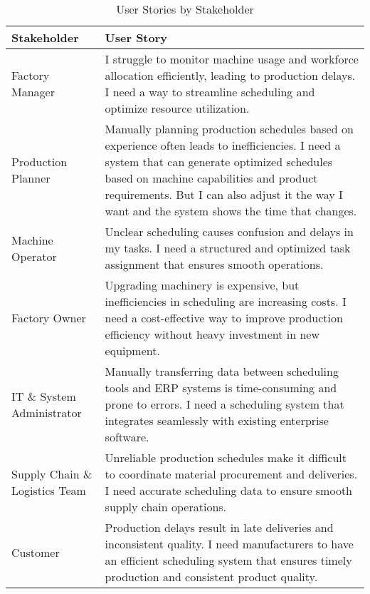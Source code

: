 \begin{table}[!h]
    \begin{adjustwidth}{-.85in}{-.85in}
        \noindent
        \centering
        \small\begin{tabularx}{1.3\textwidth}{|>{\columncolor{yellow!20}\raggedright\arraybackslash}p{2.5cm}|X|}
            \hline
            \textbf{Stakeholder} & \textbf{User Story} \\\hline
            Factory Manager & I struggle to monitor machine usage and workforce allocation efficiently, leading to production delays. I need a way to streamline scheduling and optimize resource utilization. \\\hline
            Production Planner & Manually planning production schedules based on experience often leads to inefficiencies. I need a system that can generate optimized schedules based on machine capabilities and product requirements. But I can also adjust it the way I want and the system shows the time that changes. \\\hline
            Machine Operator & Unclear scheduling causes confusion and delays in my tasks. I need a structured and optimized task assignment that ensures smooth operations. \\\hline
            Factory Owner & Upgrading machinery is expensive, but inefficiencies in scheduling are increasing costs. I need a cost-effective way to improve production efficiency without heavy investment in new equipment. \\\hline
            IT \& System Administrator & Manually transferring data between scheduling tools and ERP systems is time-consuming and prone to errors. I need a scheduling system that integrates seamlessly with existing enterprise software. \\\hline
            Supply Chain \& Logistics Team & Unreliable production schedules make it difficult to coordinate material procurement and deliveries. I need accurate scheduling data to ensure smooth supply chain operations. \\\hline
            Customer & Production delays result in late deliveries and inconsistent quality. I need manufacturers to have an efficient scheduling system that ensures timely production and consistent product quality. \\\hline
        \end{tabularx}
    \end{adjustwidth}
    \caption{User Stories by Stakeholder}
\end{table}



